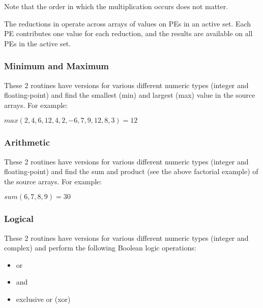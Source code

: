 \vspace{0.2in}

\noindent
Note that the order in which the multiplication occurs does not
matter.

The reductions in \openshmem operate across arrays of values on PEs in an
active set.  Each PE contributes one value for each reduction, and the
results are available on all PEs in the active set.

\subsubsection{Minimum and Maximum}

These 2 routines have versions for various different numeric types
(integer and floating-point) and find the smallest (min) and largest
(max) value in the source arrays.  For example:

\vspace{0.2in}

\begin{math}
max(2, 4, 6, 12, 4, 2, -6, 7, 9, 12, 8, 3) = 12
\end{math}

\subsubsection{Arithmetic}

These 2 routines have versions for various different numeric types
(integer and floating-point) and find the sum and product (see the
above factorial example) of the source arrays.  For example:

\vspace{0.2in}

\begin{math}
sum(6, 7, 8, 9) = 30
\end{math}

\subsubsection{Logical}

These 2 routines have versions for various different numeric types
(integer and complex) and perform the following Boolean logic
operations:

\begin{itemize}
\item or
\item and
\item exclusive or (xor)
\end{itemize}

